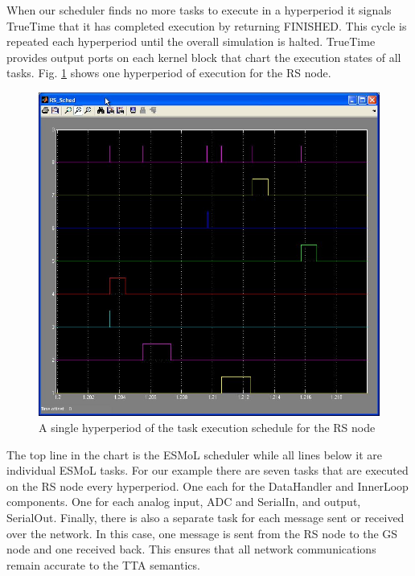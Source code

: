 When our scheduler finds no more tasks to execute in a hyperperiod it signals TrueTime that it has completed execution by returning FINISHED.  This cycle is repeated each hyperperiod until the overall simulation is halted.  TrueTime provides output ports on each kernel block that chart the execution states of all tasks.  Fig. \ref{fig:rs_schedule} shows one hyperperiod of execution for the RS node.
\begin{figure}[ht]
\centering
\includegraphics[width=\columnwidth]{figures/rs_schedule.jpg}
    \caption{A single hyperperiod of the task execution schedule for the RS node}
    \label{fig:rs_schedule}
\end{figure}
The top line in the chart is the ESMoL scheduler while all lines below it are individual ESMoL tasks.  For our example there are seven tasks that are executed on the RS node every hyperperiod.  One each for the DataHandler and InnerLoop components.  One for each analog input, ADC and SerialIn, and output, SerialOut.  Finally, there is also a separate task for each message sent or received over the network.  In this case, one message is sent from the RS node to the GS node and one received back.  This ensures that all network communications remain accurate to the TTA semantics.

